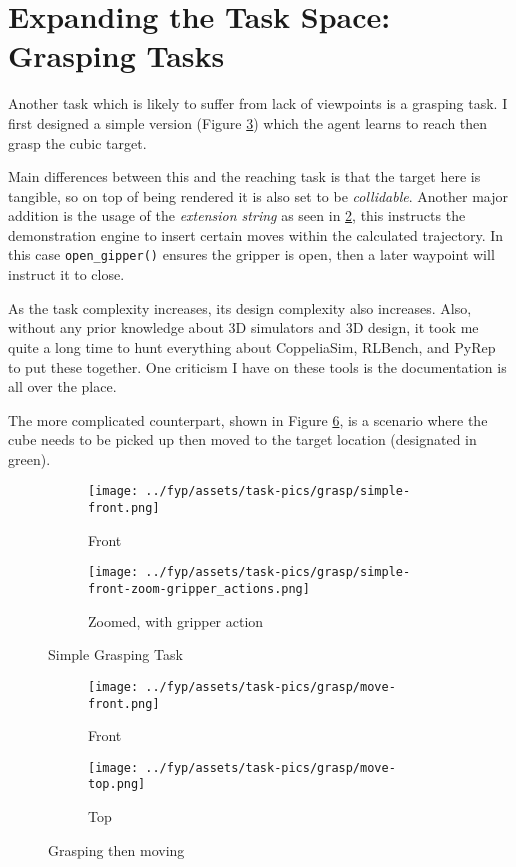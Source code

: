 \section{Expanding the Task Space: Grasping Tasks}
Another task which is likely to suffer from lack of viewpoints is a grasping task. I first designed
a simple version (Figure \ref{fig:grasp-simple}) which the agent learns to reach then grasp the cubic target. 

Main differences between this and the reaching task is that the target here is tangible, so on top of being rendered it is also set to be \emph{collidable}. Another major addition is the usage of the \emph{extension string} as seen in \ref{subfig:simple-zoom-actions}, this instructs the demonstration engine to insert certain moves within the calculated trajectory. In this case \verb|open_gipper()| ensures the gripper is open, then a later waypoint will instruct it to close. 

As the task complexity increases, its design complexity also increases. Also, without any prior knowledge about 3D simulators and 3D design, it took me quite a long time to hunt everything about CoppeliaSim, RLBench, and PyRep to put these together. One criticism I have on these tools is the documentation is all over the place. 

The more complicated counterpart, shown in Figure \ref{fig:grasp-move}, is a scenario where the cube needs to be picked up then moved to the target location (designated in green).

\begin{figure}[htpb] %
  \centering
  \begin{subfigure}{0.3\linewidth}
    \centering
    \texttt{[image: ../fyp/assets/task-pics/grasp/simple-front.png]}
    \caption{Front}\label{subfig:simple-front}
  \end{subfigure}
  \begin{subfigure}{0.5\linewidth}
    \centering
    \texttt{[image: ../fyp/assets/task-pics/grasp/simple-front-zoom-gripper\_actions.png]}
    \caption{Zoomed, with gripper action}\label{subfig:simple-zoom-actions}
  \end{subfigure}
  \caption{Simple Grasping Task}\label{fig:grasp-simple}
\end{figure}

\begin{figure}[htpb] %
  \centering
  \begin{subfigure}{0.45\linewidth}
    \centering
    \texttt{[image: ../fyp/assets/task-pics/grasp/move-front.png]} 
    \caption{Front}\label{subfig:grasp-move-front}
  \end{subfigure}
  \begin{subfigure}{0.45\linewidth}
    \centering
    \texttt{[image: ../fyp/assets/task-pics/grasp/move-top.png]}
    \caption{Top}\label{subfig:grasp-move-top}
  \end{subfigure}
  \caption{Grasping then moving}\label{fig:grasp-move}
\end{figure}


